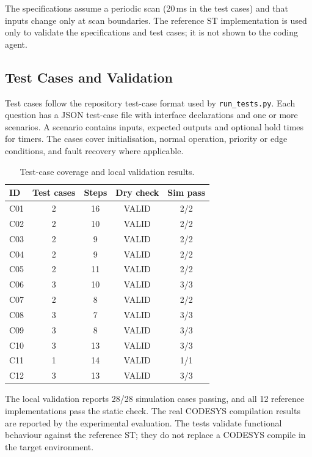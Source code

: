The specifications assume a periodic scan (20\,ms in the test cases) and that inputs change only at scan boundaries. The reference ST implementation is used only to validate the specifications and test cases; it is not shown to the coding agent.

\subsection{Test Cases and Validation}
Test cases follow the repository test-case format used by \texttt{run\_tests.py}. Each question has a JSON test-case file with interface declarations and one or more scenarios. A scenario contains inputs, expected outputs and optional hold times for timers. The cases cover initialisation, normal operation, priority or edge conditions, and fault recovery where applicable.

\begin{table}[htbp]
\centering
\small
\caption{Test-case coverage and local validation results.}
\label{tab:custom_validation}
\begin{tabular}{|l|c|c|c|c|}
\hline
ID & Test cases & Steps & Dry check & Sim pass \\
\hline
C01 & 2 & 16 & VALID & 2/2 \\
C02 & 2 & 10 & VALID & 2/2 \\
C03 & 2 & 9 & VALID & 2/2 \\
C04 & 2 & 9 & VALID & 2/2 \\
C05 & 2 & 11 & VALID & 2/2 \\
C06 & 3 & 10 & VALID & 3/3 \\
C07 & 2 & 8 & VALID & 2/2 \\
C08 & 3 & 7 & VALID & 3/3 \\
C09 & 3 & 8 & VALID & 3/3 \\
C10 & 3 & 13 & VALID & 3/3 \\
C11 & 1 & 14 & VALID & 1/1 \\
C12 & 3 & 13 & VALID & 3/3 \\
\hline
\end{tabular}
\end{table}

The local validation reports 28/28 simulation cases passing, and all 12 reference implementations pass the static check. The real CODESYS compilation results are reported by the experimental evaluation. The tests validate functional behaviour against the reference ST; they do not replace a CODESYS compile in the target environment.

